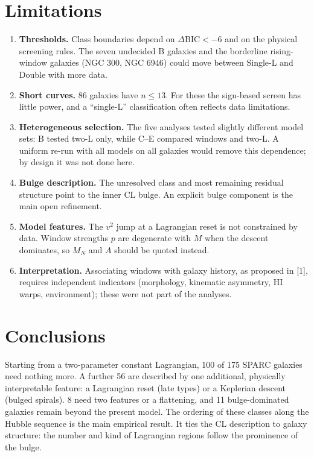 \documentclass[10pt]{article}
\begin{document}
\section{Limitations}
\begin{enumerate}\itemsep1pt
\item \textbf{Thresholds.} Class boundaries depend on $\Delta\mathrm{BIC}<-6$ and on the physical screening rules. The seven undecided B galaxies and the borderline rising-window galaxies (NGC 300, NGC 6946) could move between Single-L and Double with more data.
\item \textbf{Short curves.} 86 galaxies have $n\le13$. For these the sign-based screen has little power, and a ``single-L'' classification often reflects data limitations.
\item \textbf{Heterogeneous selection.} The five analyses tested slightly different model sets: B tested two-L only, while C--E compared windows and two-L. A uniform re-run with all models on all galaxies would remove this dependence; by design it was not done here.
\item \textbf{Bulge description.} The unresolved class and most remaining residual structure point to the inner CL bulge. An explicit bulge component is the main open refinement.
\item \textbf{Model features.} The $v^2$ jump at a Lagrangian reset is not constrained by data. Window strengths $p$ are degenerate with $M$ when the descent dominates, so $M_N$ and $A$ should be quoted instead.
\item \textbf{Interpretation.} Associating windows with galaxy history, as proposed in [1], requires independent indicators (morphology, kinematic asymmetry, HI warps, environment); these were not part of the analyses.
\end{enumerate}
\section{Conclusions}
Starting from a two-parameter constant Lagrangian, 100 of 175 SPARC galaxies need nothing more. A further 56 are described by one additional, physically interpretable feature: a Lagrangian reset (late types) or a Keplerian descent (bulged spirals). 8 need two features or a flattening, and 11 bulge-dominated galaxies remain beyond the present model. The ordering of these classes along the Hubble sequence is the main empirical result. It ties the CL description to galaxy structure: the number and kind of Lagrangian regions follow the prominence of the bulge.
\end{document}
